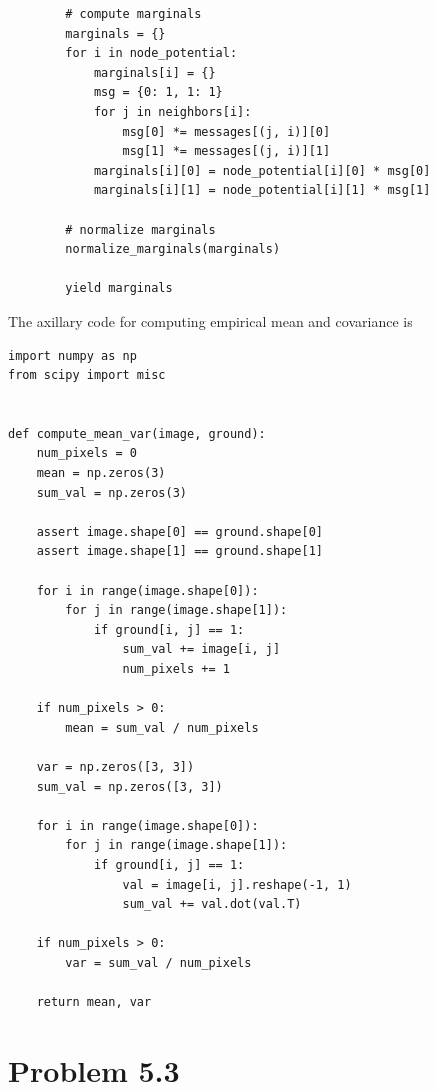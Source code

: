 \documentclass{article}
\begin{document}
\begin{lstlisting}
        # compute marginals
        marginals = {}
        for i in node_potential:
            marginals[i] = {}
            msg = {0: 1, 1: 1}
            for j in neighbors[i]:
                msg[0] *= messages[(j, i)][0]
                msg[1] *= messages[(j, i)][1]
            marginals[i][0] = node_potential[i][0] * msg[0]
            marginals[i][1] = node_potential[i][1] * msg[1]

        # normalize marginals
        normalize_marginals(marginals)

        yield marginals

\end{lstlisting}

The axillary code for computing empirical mean and covariance is 
\lstset{language=Python}
\lstset{frame=lines}
\lstset{basicstyle=\footnotesize}
\begin{lstlisting}
import numpy as np
from scipy import misc


def compute_mean_var(image, ground):
    num_pixels = 0
    mean = np.zeros(3)
    sum_val = np.zeros(3)

    assert image.shape[0] == ground.shape[0]
    assert image.shape[1] == ground.shape[1]

    for i in range(image.shape[0]):
        for j in range(image.shape[1]):
            if ground[i, j] == 1:
                sum_val += image[i, j]
                num_pixels += 1

    if num_pixels > 0:
        mean = sum_val / num_pixels

    var = np.zeros([3, 3])
    sum_val = np.zeros([3, 3])

    for i in range(image.shape[0]):
        for j in range(image.shape[1]):
            if ground[i, j] == 1:
                val = image[i, j].reshape(-1, 1)
                sum_val += val.dot(val.T)

    if num_pixels > 0:
        var = sum_val / num_pixels

    return mean, var

\end{lstlisting}
\pagebreak

\section*{Problem 5.3}
\pagebreak

\end{document}
